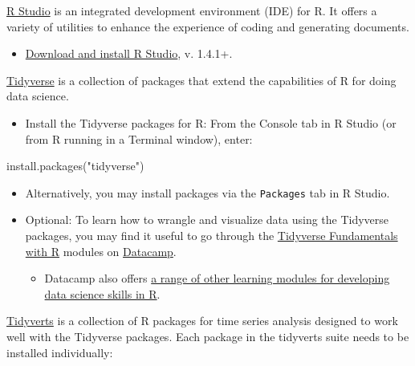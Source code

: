 \documentclass[
]{book}
\newenvironment{Shaded}{\begin{snugshade}}{\end{snugshade}}
\newcommand{\FunctionTok}[1]{\textcolor[rgb]{0.00,0.00,0.00}{#1}}
\newcommand{\NormalTok}[1]{#1}
\newcommand{\StringTok}[1]{\textcolor[rgb]{0.31,0.60,0.02}{#1}}
\providecommand{\tightlist}{%
  \setlength{\itemsep}{0pt}\setlength{\parskip}{0pt}}
\begin{document}
\href{https://rstudio.com/products/rstudio/}{R Studio} is an integrated development environment (IDE) for R. It offers a variety of utilities to enhance the experience of coding and generating documents.

\begin{itemize}
\tightlist
\item
  \href{https://rstudio.com/products/rstudio/download/\#download}{Download and install R Studio}, v. 1.4.1+.
\end{itemize}

\href{https://www.tidyverse.org/}{Tidyverse} is a collection of packages that extend the capabilities of R for doing data science.

\begin{itemize}
\tightlist
\item
  Install the Tidyverse packages for R: From the Console tab in R Studio (or from R running in a Terminal window), enter:
\end{itemize}

\begin{Shaded}
\begin{Highlighting}[]
\FunctionTok{install.packages}\NormalTok{(}\StringTok{"tidyverse"}\NormalTok{)}
\end{Highlighting}
\end{Shaded}

\begin{itemize}
\item
  Alternatively, you may install packages via the \texttt{Packages} tab in R Studio.
\item
  Optional: To learn how to wrangle and visualize data using the Tidyverse packages, you may find it useful to go through the \href{https://learn.datacamp.com/skill-tracks/tidyverse-fundamentals}{Tidyverse Fundamentals with R} modules on \href{https://learn.datacamp.com/}{Datacamp}.

  \begin{itemize}
  \tightlist
  \item
    Datacamp also offers \href{https://learn.datacamp.com/career-tracks/data-scientist-with-r}{a range of other learning modules for developing data science skills in R}.
  \end{itemize}
\end{itemize}

\href{https://tidyverts.org/}{Tidyverts} is a collection of R packages for time series analysis designed to work well with the Tidyverse packages. Each package in the tidyverts suite needs to be installed individually:
\end{document}
